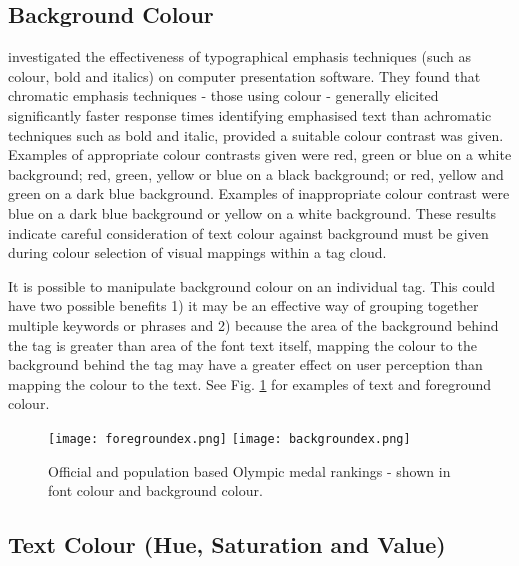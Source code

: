 \subsection{Background Colour}

\citet{preston10} investigated the effectiveness of typographical emphasis techniques (such as colour, bold and italics) on computer presentation software. They found that chromatic emphasis techniques - those using colour - generally elicited significantly faster response times identifying emphasised text than achromatic techniques such as bold and italic, provided a suitable colour contrast was given. Examples of appropriate colour contrasts given were red, green or blue on a white background; red, green, yellow or blue on a black background; or red, yellow and green on a dark blue background. Examples of inappropriate colour contrast were blue on a dark blue background or yellow on a white background. These results indicate careful consideration of text colour against background must be given during colour selection of visual mappings within a tag cloud.

It is possible to manipulate background colour on an individual tag. This could have two possible benefits 1) it may be an effective way of grouping together multiple keywords or phrases and 2) because the area of the background behind the tag is greater than area of the font text itself, mapping the colour to the background behind the tag may have a greater effect on user perception than mapping the colour to the text. See Fig. \ref{fig:background} for examples of text and foreground colour.

\begin{figure}[h!]
  \centering
  \texttt{[image: foregroundex.png]}
  \texttt{[image: backgroundex.png]}
  \caption{Official and population based Olympic medal rankings - shown in font colour and background colour.}
  \label{fig:background}
\end{figure}

\subsection{Text Colour (Hue, Saturation and Value)}

